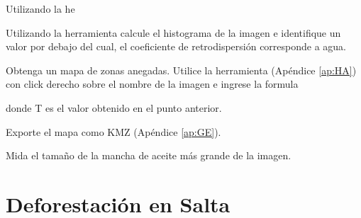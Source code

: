\begin{que}
  Utilizando la he
\end{que}

\begin{que}
    Utilizando la herramienta  calcule el histograma de la imagen e identifique un valor por debajo del cual, el coeficiente de retrodispersión corresponde a agua.
\end{que}

\begin{que}
  Obtenga un mapa de zonas anegadas. Utilice la herramienta  (Apéndice \ref{ap:HA}) con click derecho sobre el nombre de la imagen e ingrese la formula
  \begin{center}
  \end{center}
  donde T es el valor obtenido en el punto anterior.
\end{que}

\begin{que}
    Exporte el mapa como KMZ (Apéndice \ref{ap:GE}).
\end{que}

\begin{que}
    Mida el tamaño de la mancha de aceite más grande de la imagen.
\end{que}

\section{Deforestación en Salta}




